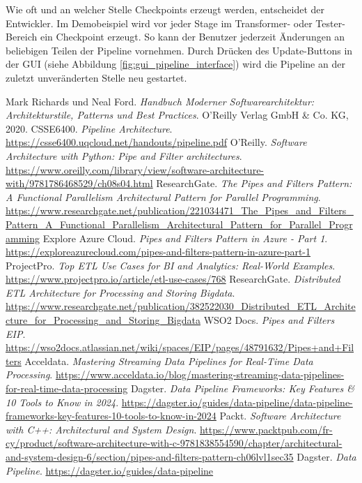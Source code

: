\documentclass[10pt,a4paper]{article}
\begin{document}
Wie oft und an welcher Stelle Checkpoints erzeugt werden, entscheidet der Entwickler. Im Demobeispiel wird vor jeder Stage im Transformer- oder Tester-Bereich ein Checkpoint erzeugt. So kann der Benutzer jederzeit Änderungen an beliebigen Teilen der Pipeline vornehmen. Durch Drücken des Update-Buttons in der GUI (siehe Abbildung \ref{fig:gui_pipeline_interface}) wird die Pipeline an der zuletzt unveränderten Stelle neu gestartet.

\newpage
\begin{thebibliography}{99}
 Mark Richards und Neal Ford. \textit{Handbuch Moderner Softwarearchitektur: Architekturstile, Patterns und Best Practices}. O'Reilly Verlag GmbH & Co. KG, 2020.
 CSSE6400. \textit{Pipeline Architecture}. \url{https://csse6400.uqcloud.net/handouts/pipeline.pdf}
 O'Reilly. \textit{Software Architecture with Python: Pipe and Filter architectures}. \url{https://www.oreilly.com/library/view/software-architecture-with/9781786468529/ch08s04.html}
 ResearchGate. \textit{The Pipes and Filters Pattern: A Functional Parallelism Architectural Pattern for Parallel Programming}. \url{https://www.researchgate.net/publication/221034471_The_Pipes_and_Filters_Pattern_A_Functional_Parallelism_Architectural_Pattern_for_Parallel_Programming}
 Explore Azure Cloud. \textit{Pipes and Filters Pattern in Azure - Part 1}. \url{https://exploreazurecloud.com/pipes-and-filters-pattern-in-azure-part-1}
 ProjectPro. \textit{Top ETL Use Cases for BI and Analytics: Real-World Examples}. \url{https://www.projectpro.io/article/etl-use-cases/768}
 ResearchGate. \textit{Distributed ETL Architecture for Processing and Storing Bigdata}. \url{https://www.researchgate.net/publication/382522030_Distributed_ETL_Architecture_for_Processing_and_Storing_Bigdata}
 WSO2 Docs. \textit{Pipes and Filters EIP}. \url{https://wso2docs.atlassian.net/wiki/spaces/EIP/pages/48791632/Pipes+and+Filters}
 Acceldata. \textit{Mastering Streaming Data Pipelines for Real-Time Data Processing}. \url{https://www.acceldata.io/blog/mastering-streaming-data-pipelines-for-real-time-data-processing}
 Dagster. \textit{Data Pipeline Frameworks: Key Features & 10 Tools to Know in 2024}. \url{https://dagster.io/guides/data-pipeline/data-pipeline-frameworks-key-features-10-tools-to-know-in-2024}
 Packt. \textit{Software Architecture with C++: Architectural and System Design}. \url{https://www.packtpub.com/fr-cy/product/software-architecture-with-c-9781838554590/chapter/architectural-and-system-design-6/section/pipes-and-filters-pattern-ch06lvl1sec35}
 Dagster. \textit{Data Pipeline}. \url{https://dagster.io/guides/data-pipeline}
\end{thebibliography}
\end{document}
